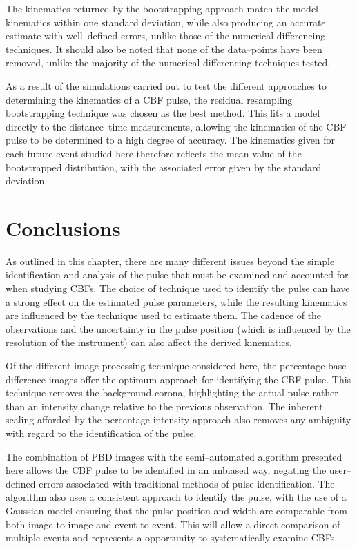 The kinematics returned by the bootstrapping approach match the model kinematics within one standard deviation, while also producing an accurate estimate with well--defined errors, unlike those of the numerical differencing techniques. It should also be noted that none of the data--points have been removed, unlike the majority of the numerical differencing techniques tested. 

As a result of the simulations carried out to test the different approaches to determining the kinematics of a CBF pulse, the residual resampling bootstrapping technique was chosen as the best method. This fits a model directly to the distance--time measurements, allowing the kinematics of the CBF pulse to be determined to a high degree of accuracy. The kinematics given for each future event studied here therefore reflects the mean value of the bootstrapped distribution, with the associated error given by the standard deviation.

\section{Conclusions}
\label{sect:methods_conc}

As outlined in this chapter, there are many different issues beyond the simple identification and analysis of the pulse that must be examined and accounted for when studying CBFs. The choice of technique used to identify the pulse can have a strong effect on the estimated pulse parameters, while the resulting kinematics are influenced by the technique used to estimate them. The cadence of the observations and the uncertainty in the pulse position (which is influenced by the resolution of the instrument) can also affect the derived kinematics.

Of the different image processing technique considered here, the percentage base difference images offer the optimum approach for identifying the CBF pulse. This technique removes the background corona, highlighting the actual pulse rather than an intensity change relative to the previous observation. The inherent scaling afforded by the percentage intensity approach also removes any ambiguity with regard to the identification of the pulse. 

The combination of PBD images with the semi--automated algorithm presented here allows the CBF pulse to be identified in an unbiased way, negating the user--defined errors associated with traditional methods of pulse identification. The algorithm also uses a consistent approach to identify the pulse, with the use of a Gaussian model ensuring that the pulse position and width are comparable from both image to image and event to event. This will allow a direct comparison of multiple events and represents a opportunity to systematically examine CBFs.


